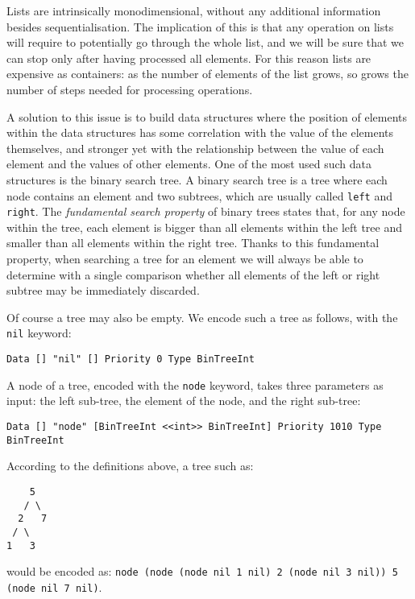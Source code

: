 Lists are intrinsically monodimensional, without any additional information besides sequentialisation. The implication of this is that any operation on lists will require to potentially go through the whole list, and we will be sure that we can stop only after having processed all elements. For this reason lists are expensive as containers: as the number of elements of the list grows, so grows the number of steps needed for processing operations.

A solution to this issue is to build data structures where the position of elements within the data structures has some correlation with the value of the elements themselves, and stronger yet with the relationship between the value of each element and the values of other elements. One of the most used such data structures is the binary search tree. A binary search tree is a tree where each node contains an element and two subtrees, which are usually called \texttt{left} and \texttt{right}. The \textit{fundamental search property} of binary trees states that, for any node within the tree, each element is bigger than all elements within the left tree and smaller than all elements within the right tree. Thanks to this fundamental property, when searching a tree for an element we will always be able to determine with a single comparison whether all elements of the left or right subtree may be immediately discarded.

Of course a tree may also be empty. We encode such a tree as follows, with the \texttt{nil} keyword:

\begin{lstlisting}
Data [] "nil" [] Priority 0 Type BinTreeInt
\end{lstlisting}

A node of a tree, encoded with the \texttt{node} keyword, takes three parameters as input: the left sub-tree, the element of the node, and the right sub-tree:

\begin{lstlisting}
Data [] "node" [BinTreeInt <<int>> BinTreeInt] Priority 1010 Type BinTreeInt
\end{lstlisting}

According to the definitions above, a tree such as:

\begin{lstlisting}
    5
   / \
  2   7
 / \
1   3
\end{lstlisting}

would be encoded as: \texttt{node (node (node nil 1 nil) 2 (node nil 3 nil)) 5 (node nil 7 nil)}.

